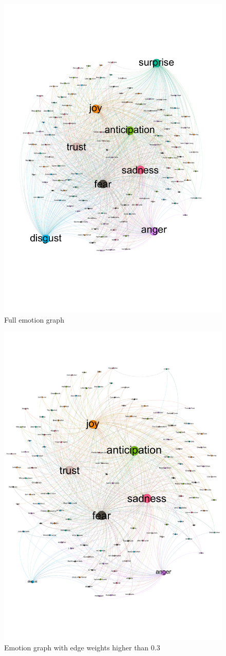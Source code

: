 \documentclass[10pt,a4paper]{article}
\begin{document}
		\begin{figure}[htb]
			\centering
			\includegraphics[trim=0mm 50mm 0mm 50mm, clip, width=0.7\linewidth]{data/emotion_graph}
			\caption{Full emotion graph}
			\label{fig:emotiongraph}
		\end{figure}
		
		\begin{figure}[htb]
			\centering
			\includegraphics[trim=0mm 50mm 0mm 30mm, clip, width=0.7\linewidth]{data/emotion_graph_weight3-7}
			\caption{Emotion graph with edge weights higher than $0.3$}
			\label{fig:reducedemotiongraph}
		\end{figure}
		
\end{document}
